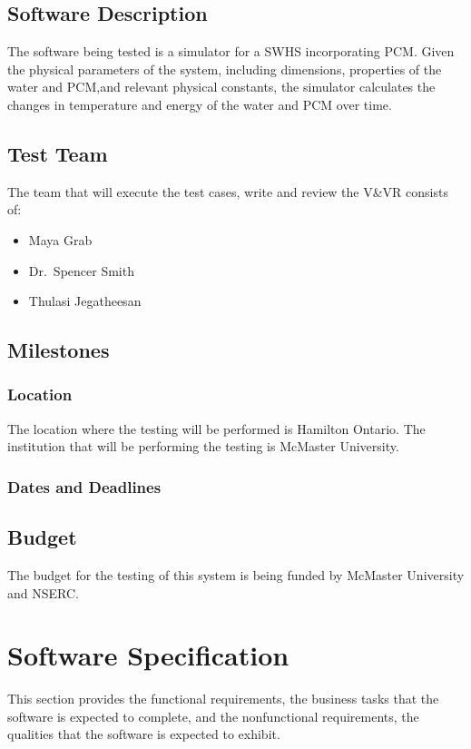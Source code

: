 \documentclass[12pt]{article}
\begin{document}
\subsection{Software Description}
The software being tested is a simulator for a SWHS
incorporating PCM. Given the physical parameters of the system,
 including dimensions, properties of the water and PCM,and relevant physical constants,
  the simulator calculates the changes in temperature and energy of the water and PCM 
  over time.

\subsection{Test Team} 
The team that will execute the test cases, write and review the V\&VR consists of:

\begin{itemize}
 \item Maya Grab 
 \item Dr.\ Spencer Smith
 \item Thulasi Jegatheesan 
\end{itemize}  

\subsection{Milestones}

\subsubsection{Location}
The location where the testing will be performed is Hamilton Ontario. The institution that
will be performing the testing is McMaster University. 


\subsubsection{Dates and Deadlines}
\subsection{Budget}
The budget for the testing of this system is being funded by McMaster University and NSERC.

%
%

\section{ Software Specification}
This section provides the functional requirements, the business tasks that the
software is expected to complete, and the nonfunctional requirements, the
qualities that the software is expected to exhibit.
\end{document}
